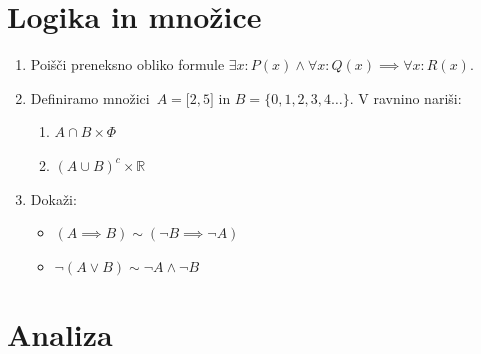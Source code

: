 \documentclass[a4paper,12pt]{article}
\begin{document}

\section*{Logika in množice}

\begin{enumerate}
\item
Poišči preneksno obliko formule $\exists x : P(x) \land \forall x : Q(x) \implies \forall x : R(x)$.

\item
Definiramo množici\, $A = \lbrack 2,5 \rbrack$ in $B = \lbrace 0,1,2,3,4\ldots\rbrace$.
V ravnino nariši:
\begin{enumerate}
\item $A \cap B \times \Phi$
\item $(A \cup B)^c \times \mathbb{R}$
\end{enumerate}

\item
Dokaži:
\begin{itemize}
\item $(A \implies B) \sim (\lnot B \implies \lnot A)$
\item $\lnot(A \lor B) \sim \lnot A \land \lnot B$
\end{itemize}
\end{enumerate}

\section*{Analiza}
\end{document}
